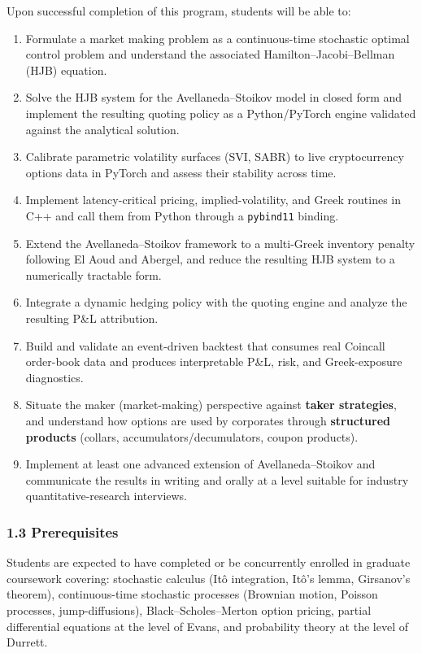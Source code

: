 \documentclass[
]{article}
\providecommand{\tightlist}{%
  \setlength{\itemsep}{0pt}\setlength{\parskip}{0pt}}
\begin{document}
Upon successful completion of this program, students will be able to:

\begin{enumerate}
\def\labelenumi{\arabic{enumi}.}
\tightlist
\item
  Formulate a market making problem as a continuous-time stochastic
  optimal control problem and understand the associated
  Hamilton--Jacobi--Bellman (HJB) equation.
\item
  Solve the HJB system for the Avellaneda--Stoikov model in closed form
  and implement the resulting quoting policy as a Python/PyTorch engine
  validated against the analytical solution.
\item
  Calibrate parametric volatility surfaces (SVI, SABR) to live
  cryptocurrency options data in PyTorch and assess their stability
  across time.
\item
  Implement latency-critical pricing, implied-volatility, and Greek
  routines in C++ and call them from Python through a \texttt{pybind11}
  binding.
\item
  Extend the Avellaneda--Stoikov framework to a multi-Greek inventory
  penalty following El Aoud and Abergel, and reduce the resulting HJB
  system to a numerically tractable form.
\item
  Integrate a dynamic hedging policy with the quoting engine and analyze
  the resulting P\&L attribution.
\item
  Build and validate an event-driven backtest that consumes real
  Coincall order-book data and produces interpretable P\&L, risk, and
  Greek-exposure diagnostics.
\item
  Situate the maker (market-making) perspective against \textbf{taker
  strategies}, and understand how options are used by corporates through
  \textbf{structured products} (collars, accumulators/decumulators,
  coupon products).
\item
  Implement at least one advanced extension of Avellaneda--Stoikov and
  communicate the results in writing and orally at a level suitable for
  industry quantitative-research interviews.
\end{enumerate}

\subsubsection{1.3 Prerequisites}\label{prerequisites}

Students are expected to have completed or be concurrently enrolled in
graduate coursework covering: stochastic calculus (Itô integration,
Itô's lemma, Girsanov's theorem), continuous-time stochastic processes
(Brownian motion, Poisson processes, jump-diffusions),
Black--Scholes--Merton option pricing, partial differential equations at
the level of Evans, and probability theory at the level of Durrett.
\end{document}
